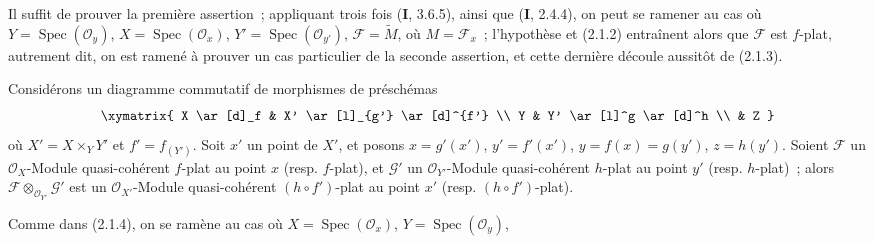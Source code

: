 Il suffit de prouver la première assertion~; appliquant trois fois (\textbf{I}, 3.6.5),
ainsi que (\textbf{I}, 2.4.4), on peut se ramener au cas où
$Y=\operatorname{Spec}(\mathcal O_y)$, $X=\operatorname{Spec}(\mathcal O_x)$,
$Y'=\operatorname{Spec}(\mathcal O_{y'})$, $\mathscr F=\widetilde M$, où
$M=\mathscr F_x$~; l'hypothèse et (2.1.2) entraînent alors que $\mathscr F$
est $f$-plat, autrement dit, on est ramené à prouver un cas particulier de la
seconde assertion, et cette dernière découle aussitôt de (2.1.3).

\begin{proposition}[2.1.5]
\label{IV.2.1.5-fr}
Considérons un diagramme commutatif de morphismes de préschémas
\[
\xymatrix{
  X \ar[d]_f & X' \ar[l]_{g'} \ar[d]^{f'} \\
  Y & Y' \ar[l]^g \ar[d]^h \\
  & Z
}
\]
où $X'=X\times_Y Y'$ et $f'=f_{(Y')}$. Soit $x'$ un point de $X'$, et
posons $x=g'(x')$, $y'=f'(x')$, $y=f(x)=g(y')$, $z=h(y')$. Soient
$\mathscr F$ un $\mathcal O_X$-Module quasi-cohérent $f$-plat au point $x$
(\textup{resp.} $f$-plat), et $\mathscr G'$ un $\mathcal O_{Y'}$-Module quasi-cohérent
$h$-plat au point $y'$ (\textup{resp.} $h$-plat)~; alors
$\mathscr F\otimes_{\mathcal O_{Y'}}\mathscr G'$ est un $\mathcal O_{X'}$-Module
quasi-cohérent $(h\circ f')$-plat au point $x'$ (\textup{resp.} $(h\circ f')$-plat).
\end{proposition}

Comme dans (2.1.4), on se ramène au cas où
$X=\operatorname{Spec}(\mathcal O_x)$, $Y=\operatorname{Spec}(\mathcal O_y)$,
